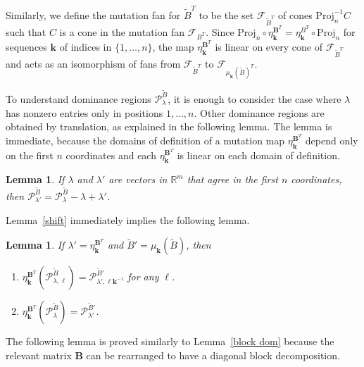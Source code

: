 \documentclass{amsart}
\newtheorem{lemma}[proposition]{Lemma}
\theoremstyle{definition}
\theoremstyle{remark}
\numberwithin{equation}{section}
\newcommand{\reals}{\mathbb R}
\newcommand{\set}[1]{{\lbrace #1 \rbrace}}
\newcommand{\F}{{\mathcal F}}
\newcommand{\0}{{\mathbf{0}}}
\newcommand{\Proj}{\mathrm{Proj}}
\newcommand{\kk}{{\boldsymbol{k}}}
\renewcommand{\ll}{{\boldsymbol\ell}}
\newcommand{\tB}{{\tilde{B}}}
\newcommand{\BB}{\mathbf{B}}
\renewcommand{\P}{\mathcal{P}}
\begin{document}
Similarly, we define the mutation fan for $\tB^T$ to be the set $\F_{\tB^T}$ of cones $\Proj_n^{-1}C$ such that $C$ is a cone in the mutation fan $\F_{B^T}$.
Since $\Proj_n\circ\eta_\kk^{\BB^T}=\eta_\kk^{B^T}\circ\Proj_n$ for sequences $\kk$ of indices in $\set{1,\ldots,n}$, the map $\eta_\kk^{\BB^T}$ is linear on every cone of $\F_{\tB^T}$ and acts as an isomorphism of fans from $\F_{\tB^T}$ to $\F_{\mu_\kk(\tB)^T}$.

To understand dominance regions $\P^\tB_\lambda$, it is enough to consider the case where $\lambda$ has nonzero entries only in positions $1,\ldots,n$.
Other dominance regions are obtained by translation, as explained in the following lemma.
The lemma is immediate, because the domains of definition of a mutation map $\eta_\kk^{\BB^T}$ depend only on the first $n$ coordinates and each $\eta_\kk^{\BB^T}$ is linear on each domain of definition.
\begin{lemma}\label{after all coefficients are just coefficients}
If $\lambda$ and $\lambda'$ are vectors in $\reals^m$ that agree in the first $n$ coordinates, then $\P^\tB_{\lambda'}=\P^\tB_\lambda-\lambda+\lambda'$.
\end{lemma}

Lemma~\ref{shift} immediately implies the following lemma.
\begin{lemma}\label{shift extended}
If $\lambda'=\eta^{\BB^T}_\kk$ and $\tB'=\mu_\kk(\tB)$, then 
\begin{enumerate}[label=\bf\arabic*., ref=\arabic*]
\item \label{shift extended one}
$\eta^{\BB^T}_\kk\!\!(\P^\tB_{\lambda,\ll})=\P^{\tB'}_{\lambda',\ll\kk^{-1}}$ for any $\ll$.
\item \label{shift extended all}
$\eta^{\BB^T}_\kk\!\!(\P^\tB_\lambda)=\P^{\tB'}_{\lambda'}$.
\end{enumerate}
\end{lemma}

The following lemma is proved similarly to Lemma~\ref{block dom} because the relevant matrix $\BB$ can be rearranged to have a diagonal block decomposition.
\end{document}
